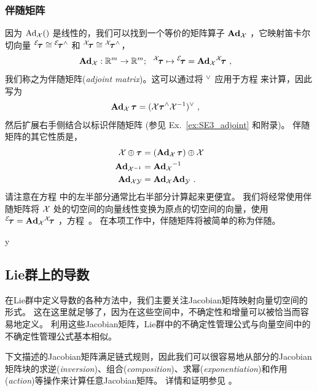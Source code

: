 \subsubsection{伴随矩阵}
因为 $\Adh{\cX}()$ 是线性的，我们可以找到一个等价的矩阵算子 $\Ad{\cX}$ ，它映射笛卡尔切向量 ${^\cE}\!\bftau\cong{^\cE}\!\bftau\hhat$ 和 ${^\cX}\!\bftau\cong{^\cX}\!\bftau\hhat$，
%
\begin{align}
\Ad{\cX}:\bbR^m\to\bbR^m;~~ ^\cX\!\bftau\mapsto {^\cE}\!\bftau &= \Ad[\cM]{\cX}{^\cX}\!\bftau \label{equ:Adj2} 
~,
\end{align}
%
我们称之为伴随矩阵(\emph{adjoint matrix})。这可以通过将 $\vvee$ 应用于方程  来计算，因此写为
%
\begin{align}\label{equ:Adj4} 
\Ad[\cM]{\cX}\,\bftau &= (\cX\bftau\hhat\cX\inv)\vvee 
~,
\end{align}
%
然后扩展右手侧结合以标识伴随矩阵 (参见 Ex.~\ref{ex:SE3_adjoint} 和附录)。
伴随矩阵的其它性质是，
%
\begin{align}
\cX\op\bftau &= (\Ad[\cM]{\cX}\,\bftau)\op\cX \label{equ:Adj1} \\
\Ad[\cM]{\cX\inv} &= \Ad[\cM]{\cX}\inv \label{equ:Adj5} \\
\Ad[\cM]{\cX\cY} &=\Ad[\cM]{\cX}\Ad[\cM]{\cY} \label{equ:Adj7}
~.
\end{align}
%
请注意在方程  中的左半部分通常比右半部分计算起来更便宜。
我们将经常使用伴随矩阵将 $\cX$ 处的切空间的向量线性变换为原点的切空间的向量，使用 ${^\cE}\!\bftau = \Ad{\cX}{^\cX}\!\bftau$ ，方程~。
在本项工作中，伴随矩阵将被简单的称为伴随。



\if\examples y

\fi




\subsection{Lie群上的导数}

在Lie群中定义导数的各种方法中，我们主要关注Jacobian矩阵映射向量切空间的形式。 
这在这里就足够了，因为在这些空间中，不确定性和增量可以被恰当而容易地定义。
利用这些Jacobian矩阵，Lie群中的不确定性管理公式与向量空间中的不确定性管理公式基本相似。

下文描述的Jacobian矩阵满足链式规则，因此我们可以很容易地从部分的Jacobian矩阵块的求逆(\emph{inversion})、组合(\emph{composition})、求幂(\emph{exponentiation})和作用(\emph{action})等操作来计算任意Jacobian矩阵。
详情和证明参见  。


